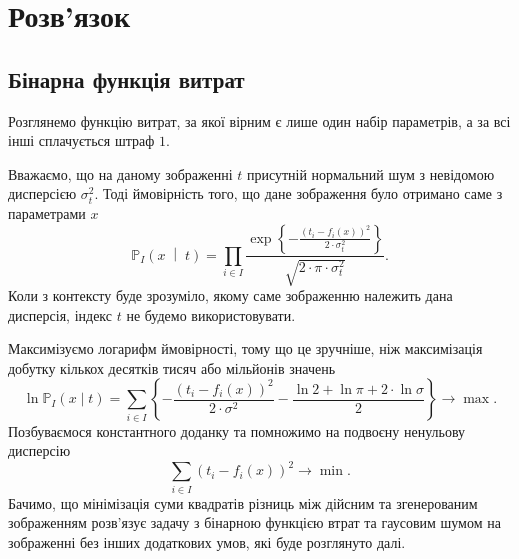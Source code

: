 \section{Розв'язок}

\subsection{Бінарна функція витрат}

Розглянемо функцію витрат,
за якої вірним є лише один набір параметрів,
а за всі інші сплачується штраф $1$.

Вважаємо, що на даному зображенні $t$
присутній нормальний шум з невідомою дисперсією $\sigma^2_t$.
Тоді ймовірність того,
що дане зображення було отримано саме з параметрами $x$
\begin{equation*}
  \mathbb{P}_I\left( x \;\middle|\; t \right)
  = \prod_{i \in I}
    \frac{\exp{\left\{- \frac{\left( t_i - f_i\left( x \right) \right)^2}
           {2 \cdot \sigma^2_t} \right\}}}
           {\sqrt{2 \cdot \pi \cdot \sigma^2_t}}.
\end{equation*}
Коли з контексту буде зрозуміло,
якому саме зображенню належить дана дисперсія,
індекс $t$ не будемо використовувати.

Максимізуємо логарифм ймовірності,
тому що це зручніше,
ніж максимізація добутку кількох десятків тисяч або мільйонів значень
\begin{equation*}
  \ln{\mathbb{P}_I\left( x \mid t \right)}
  = \sum_{i \in I}
    \left\{
      - \frac{\left( t_i - f_i\left( x \right) \right)^2}{2 \cdot \sigma^2}
      - \frac{\ln{2} + \ln{\pi} + 2 \cdot \ln{\sigma}}{2}
    \right\}
  \to \max.
\end{equation*}
Позбуваємося константного доданку та помножимо на подвоєну ненульову дисперсію
\begin{equation*}
  \sum_{i \in I} \left( t_i - f_i\left( x \right) \right)^2 \to \min.
\end{equation*}
Бачимо,
що мінімізація суми квадратів різниць між дійсним та згенерованим зображенням
розв'язує задачу з бінарною функцією втрат
та гаусовим шумом на зображенні без інших додаткових умов,
які буде розглянуто далі.

